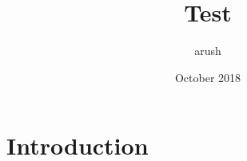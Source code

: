 \documentclass{article}
\title{Test}
\author{arush }
\date{October 2018}
\begin{document}
\maketitle

\section{Introduction}
\end{document}
